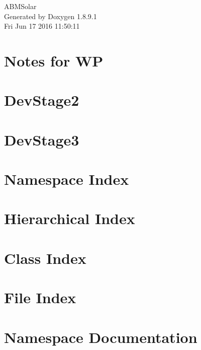 \documentclass[twoside]{book}
\newcommand{\+}{\discretionary{\mbox{\scriptsize$\hookleftarrow$}}{}{}}
\newcommand{\clearemptydoublepage}{%
  \newpage{\pagestyle{empty}\cleardoublepage}%
}
\begin{document}
\hypersetup{pageanchor=false,
             bookmarks=true,
             bookmarksnumbered=true,
             pdfencoding=unicode
            }
\begin{titlepage}
\vspace*{7cm}
\begin{center}%
{\Large A\+B\+M\+Solar }\\
\vspace*{1cm}
{\large Generated by Doxygen 1.8.9.1}\\
\vspace*{0.5cm}
{\small Fri Jun 17 2016 11:50:11}\\
\end{center}
\end{titlepage}
\clearemptydoublepage
\tableofcontents
\clearemptydoublepage
{}
\hypersetup{pageanchor=true}

\chapter{Notes for W\+P}
\label{wp}
\hypertarget{wp}{}

\chapter{Dev\+Stage2}
\label{_dev_stage2}
\hypertarget{_dev_stage2}{}

\chapter{Dev\+Stage3}
\label{_dev_stage3}
\hypertarget{_dev_stage3}{}

\chapter{Namespace Index}

\chapter{Hierarchical Index}

\chapter{Class Index}

\chapter{File Index}

\chapter{Namespace Documentation}





\end{document}
